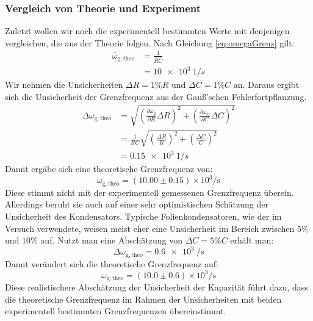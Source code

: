 \documentclass{report}
\begin{document}
\subsubsection{Vergleich von Theorie und Experiment}
Zuletzt wollen wir noch die experimentell bestimmten Werte mit denjenigen vergleichen, die aus der Theorie folgen.
Nach Gleichung \ref{eq:omegaGrenz} gilt:
\begin{equation}
    \begin{split}
        \bar{\omega}_{\mathrm{g, theo}}     &= \frac{1}{\bar{R}\bar{C}} \\
                                            &= \qty{10e3}{1/s}
    \end{split}
\end{equation}
Wir nehmen die Unsicherheiten $\Delta R = 1\% R$ und $\Delta C = 1\% C$ an. Daraus ergibt sich die Unsicherheit der Grenzfrequenz aus der Gauß'schen Fehlerfortpflanzung.
\begin{equation}
    \begin{split}
        \Delta \omega_{\mathrm{g, theo}}    &= \sqrt{\left(\frac{\partial \omega_g}{\partial R}\Delta R\right)^2 + \left(\frac{\partial \omega_G}{\partial C}\Delta C\right)^2}\\
                                            &= \frac{1}{RC} \sqrt{\left(\frac{\Delta R}{R}\right)^2 + \left(\frac{\Delta C}{C}\right)^2} \\
                                            &= \qty{0.15e3}{1/s}
    \end{split}
\end{equation}
Damit ergäbe sich eine theoretische Grenzfrequenz von:
\begin{equation}
    \omega_{\mathrm{g, theo}} = (10.00 \pm 0.15) \times 10^3 \si{\per \second}
\end{equation}
Diese stimmt nicht mit der experimentell gemessenen Grenzfrequenz überein. Allerdings beruht sie auch auf einer sehr optimistischen Schätzung der Unsicherheit des 
Kondensators. Typische Folienkondensatoren, wie der im Versuch verwendete, weisen meist eher eine Unsicherheit im Bereich zwischen $5\%$ und $10\%$ auf. Nutzt man eine Abschätzung 
von $\Delta C = 5\%C$ erhält man: 
\begin{equation}
    \Delta \omega_{\mathrm{g, theo}} = \qty{0.6e3}{\per \second}
\end{equation}
Damit verändert sich die theoretische Grenzfrequenz auf:
\begin{equation}
    \boxed{\omega_{\mathrm{g, theo}} = (10.0 \pm 0.6) \times 10^3 \si{\per\second}}
\end{equation}
Diese realistischere Abschätzung der Unsicherheit der Kapazität führt dazu, dass die theoretische Grenzfrequenz im Rahmen der Unsicherheiten mit beiden experimentell bestimmten 
Grenzfrequenzen übereinstimmt.
\end{document}
